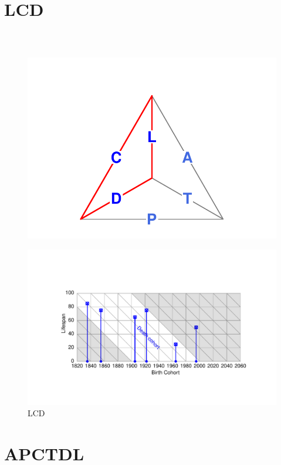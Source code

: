 \documentclass[20pt]{beamer}
\begin{document}
\section{LCD}
\begin{frame}
\frametitle{~}
\vspace{-6em}
\begin{figure}
\raggedleft
    \includegraphics[scale=.7]{Figures/TetraLCDprg.pdf}
\end{figure}
\vspace{-3em}
\begin{figure}[b]
    \centering
    \caption{LCD}
    \includegraphics{Figures/LCD.pdf}
\end{figure} 
\end{frame}

\section{APCTDL}
\end{document}
